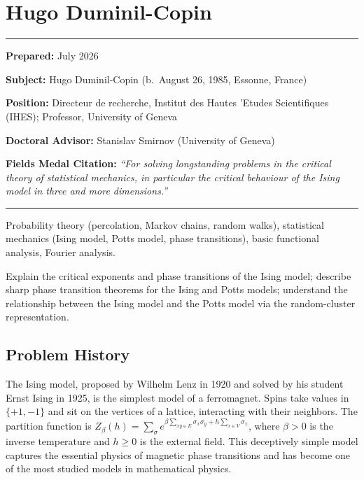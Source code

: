 \chapter{Hugo Duminil-Copin}\label{ch2022hugoduminilcopin:hugo-duminil-copin-fields-medal-2022-a-comprehensive-report-on-his-work-and-impact}

\begin{center}\rule{0.5\linewidth}{0.5pt}\end{center}

\textbf{Prepared:} July 2026

\textbf{Subject:} Hugo Duminil-Copin (b.\ August 26, 1985, Essonne, France)

\textbf{Position:} Directeur de recherche, Institut des Hautes 'Etudes Scientifiques (IHES); Professor, University of Geneva

\textbf{Doctoral Advisor:} Stanislav Smirnov (University of Geneva)

\textbf{Fields Medal Citation:} \emph{``For solving longstanding problems in the critical theory of statistical mechanics, in particular the critical behaviour of the Ising model in three and more dimensions.''}

\begin{center}\rule{0.5\linewidth}{0.5pt}\end{center}

\begin{prereqs}
Probability theory (percolation, Markov chains, random walks), statistical mechanics (Ising model, Potts model, phase transitions), basic functional analysis, Fourier analysis.
\end{prereqs}

\begin{objectives}
Explain the critical exponents and phase transitions of the Ising model; describe sharp phase transition theorems for the Ising and Potts models; understand the relationship between the Ising model and the Potts model via the random-cluster representation.
\end{objectives}

\section{Problem History}

The Ising model, proposed by Wilhelm Lenz in 1920 and solved by his student Ernst Ising in 1925, is the simplest model of a ferromagnet. Spins take values in $\{+1, -1\}$ and sit on the vertices of a lattice, interacting with their neighbors. The partition function is $Z_{\beta}(h) = \sum_{\sigma} e^{\beta \sum_{xy \in E} \sigma_x \sigma_y + h \sum_{x \in V} \sigma_x}$, where $\beta > 0$ is the inverse temperature and $h \ge 0$ is the external field. This deceptively simple model captures the essential physics of magnetic phase transitions and has become one of the most studied models in mathematical physics.

